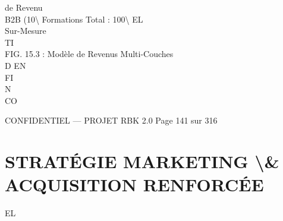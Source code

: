 de Revenu\\
\vspace{0.5em}
\vspace{0.5em}
B2B (10\textbackslash{}%
Formations         Total : 100\textbackslash{}%
\vspace{0.5em}
\vspace{0.5em}
\vspace{0.5em}
\vspace{0.5em}
EL\\
Sur-Mesure\\
\vspace{0.5em}
\vspace{0.5em}
\vspace{0.5em}
\vspace{0.5em}
TI\\
FIG. 15.3 : Modèle de Revenus Multi-Couches\\
\vspace{0.5em}
\vspace{0.5em}
\vspace{0.5em}
\vspace{0.5em}
D   EN\\
FI\\
N\\
CO\\
\vspace{0.5em}
\vspace{0.5em}
\vspace{0.5em}
\vspace{0.5em}
\begin{confidential}CONFIDENTIEL — PROJET RBK 2.0                       Page 141 sur 316\end{confidential}
\section{STRATÉGIE MARKETING \textbackslash{}& ACQUISITION RENFORCÉE}
\vspace{0.5em}
\vspace{0.5em}
\vspace{0.5em}
\vspace{0.5em}
EL\\
